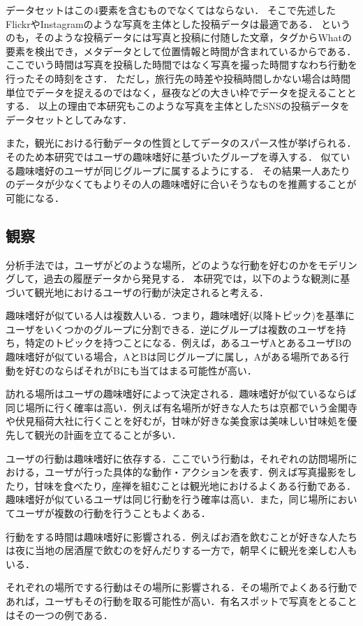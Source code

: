 \documentclass[a4j,10pt, twocolumn]{jarticle}
\begin{document}
データセットはこの4要素を含むものでなくてはならない．
そこで先述したFlickrやInstagramのような写真を主体とした投稿データは最適である．
というのも，そのような投稿データには写真と投稿に付随した文章，タグからWhatの要素を検出でき，メタデータとして位置情報と時間が含まれているからである．
ここでいう時間は写真を投稿した時間ではなく写真を撮った時間すなわち行動を行ったその時刻をさす．
ただし，旅行先の時差や投稿時間しかない場合は時間単位でデータを捉えるのではなく，昼夜などの大きい枠でデータを捉えることとする．
以上の理由で本研究もこのような写真を主体としたSNSの投稿データをデータセットとしてみなす．

また，観光における行動データの性質としてデータのスパース性が挙げられる．
そのため本研究ではユーザの趣味嗜好に基づいたグループを導入する．
似ている趣味嗜好のユーザが同じグループに属するようにする．
その結果一人あたりのデータが少なくてもよりその人の趣味嗜好に合いそうなものを推薦することが可能になる．


\subsection{観察} \label{intuition}
分析手法では，ユーザがどのような場所，どのような行動を好むのかをモデリングして，過去の履歴データから発見する．
本研究では，以下のような観測に基づいて観光地におけるユーザの行動が決定されると考える．

\begin{description}
  \setlength{\leftskip}{.5cm}
  \item[\textbf{観察1}] 趣味嗜好が似ている人は複数人いる．つまり，趣味嗜好(以降トピック)を基準にユーザをいくつかのグループに分割できる．逆にグループは複数のユーザを持ち，特定のトピックを持つことになる．例えば，あるユーザAとあるユーザBの趣味嗜好が似ている場合，AとBは同じグループに属し，Aがある場所である行動を好むのならばそれがBにも当てはまる可能性が高い．
  \item[\textbf{観察2}] 訪れる場所はユーザの趣味嗜好によって決定される．趣味嗜好が似ているならば同じ場所に行く確率は高い．例えば有名場所が好きな人たちは京都でいう金閣寺や伏見稲荷大社に行くことを好むが，甘味が好きな美食家は美味しい甘味処を優先して観光の計画を立てることが多い．
  \item[\textbf{観察3}] ユーザの行動は趣味嗜好に依存する．ここでいう行動は，それぞれの訪問場所における，ユーザが行った具体的な動作・アクションを表す．例えば写真撮影をしたり，甘味を食べたり，座禅を組むことは観光地におけるよくある行動である．趣味嗜好が似ているユーザは同じ行動を行う確率は高い．また，同じ場所においてユーザが複数の行動を行うこともよくある．
  \item[\textbf{観察4}] 行動をする時間は趣味嗜好に影響される．例えばお酒を飲むことが好きな人たちは夜に当地の居酒屋で飲むのを好んだりする一方で，朝早くに観光を楽しむ人もいる．
  \item[\textbf{観察5}] それぞれの場所でする行動はその場所に影響される．その場所でよくある行動であれば，ユーザもその行動を取る可能性が高い．有名スポットで写真をとることはその一つの例である．
\end{description}
%
\end{document}
